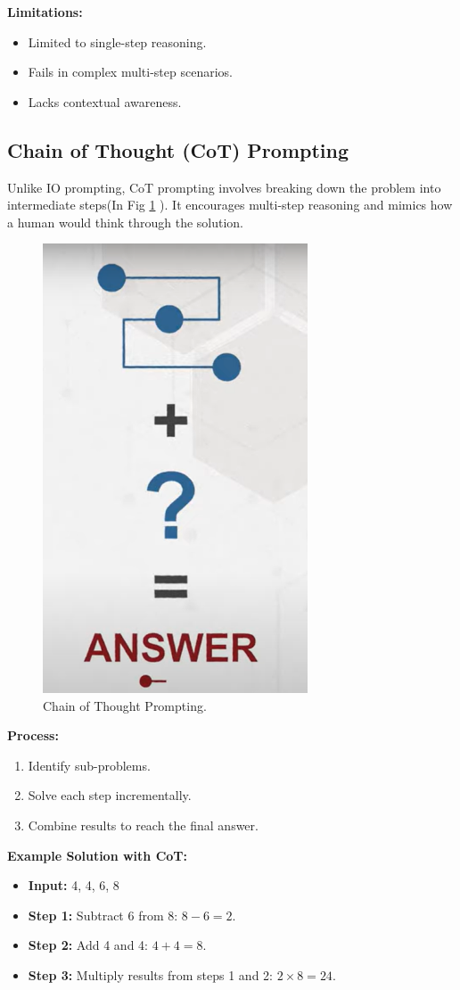 \documentclass[12pt, a4paper]{article}
\begin{document}
\textbf{Limitations:}
\begin{itemize}
    \item Limited to single-step reasoning.
    \item Fails in complex multi-step scenarios.
    \item Lacks contextual awareness.
\end{itemize}


\subsection{Chain of Thought (CoT) Prompting}
Unlike IO prompting, CoT prompting involves breaking down the problem into intermediate steps(In Fig \ref{fig:COT-prompting} ). It encourages multi-step reasoning and mimics how a human would think through the solution.
\begin{figure}[h]
    \centering    \includegraphics[width=0.7\textwidth,height=0.7\textwidth]{COT.png}
    \caption{Chain of Thought Prompting.}
    \label{fig:COT-prompting}
\end{figure}

\textbf{Process:}
\begin{enumerate}
    \item Identify sub-problems.
    \item Solve each step incrementally.
    \item Combine results to reach the final answer.
\end{enumerate}

\textbf{Example Solution with CoT:}
\begin{itemize}
    \item \textbf{Input:} 4, 4, 6, 8
    \item \textbf{Step 1:} Subtract 6 from 8: \(8 - 6 = 2\).
    \item \textbf{Step 2:} Add 4 and 4: \(4 + 4 = 8\).
    \item \textbf{Step 3:} Multiply results from steps 1 and 2: \(2 \times 8 = 24\).
\end{itemize}
\end{document}
